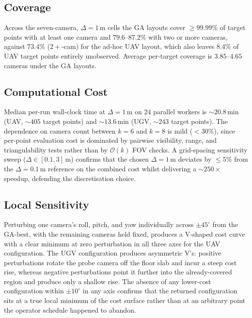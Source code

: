 \subsection{Coverage}
Across the seven-camera, $\Delta=1\,\text{m}$ cells the GA layouts cover $\geq 99.99\%$ of target points with at least one camera and $79.6$--$87.2\%$ with two or more cameras, against $73.4\%$ ($2+$-cam) for the ad-hoc UAV layout, which also leaves $8.4\%$ of UAV target points entirely unobserved. Average per-target coverage is $3.85$--$4.65$ cameras under the GA layouts.

\subsection{Computational Cost}
Median per-run wall-clock time at $\Delta=1\,\text{m}$ on $24$ parallel workers is $\sim 20.8\,\text{min}$ (UAV, $\sim 405$ target points) and $\sim 13.6\,\text{min}$ (UGV, $\sim 243$ target points). The dependence on camera count between $k=6$ and $k=8$ is mild ($<30\%$), since per-point evaluation cost is dominated by pairwise visibility, range, and triangulability tests rather than by $\mathcal{O}(k)$ FOV checks. A grid-spacing sensitivity sweep ($\Delta\in[0.1,3]\,\text{m}$) confirms that the chosen $\Delta=1\,\text{m}$ deviates by $\leq 5\%$ from the $\Delta=0.1\,\text{m}$ reference on the combined cost whilst delivering a $\sim 250\times$ speedup, defending the discretisation choice.

\subsection{Local Sensitivity}
Perturbing one camera's roll, pitch, and yaw individually across $\pm 45^\circ$ from the GA-best, with the remaining cameras held fixed, produces a V-shaped cost curve with a clear minimum at zero perturbation in all three axes for the UAV configuration. The UGV configuration produces asymmetric V's: positive perturbations rotate the probe camera off the floor slab and incur a steep cost rise, whereas negative perturbations point it further into the already-covered region and produce only a shallow rise. The absence of any lower-cost configuration within $\pm 10^\circ$ in any axis confirms that the returned configuration sits at a true local minimum of the cost surface rather than at an arbitrary point the operator schedule happened to abandon.
